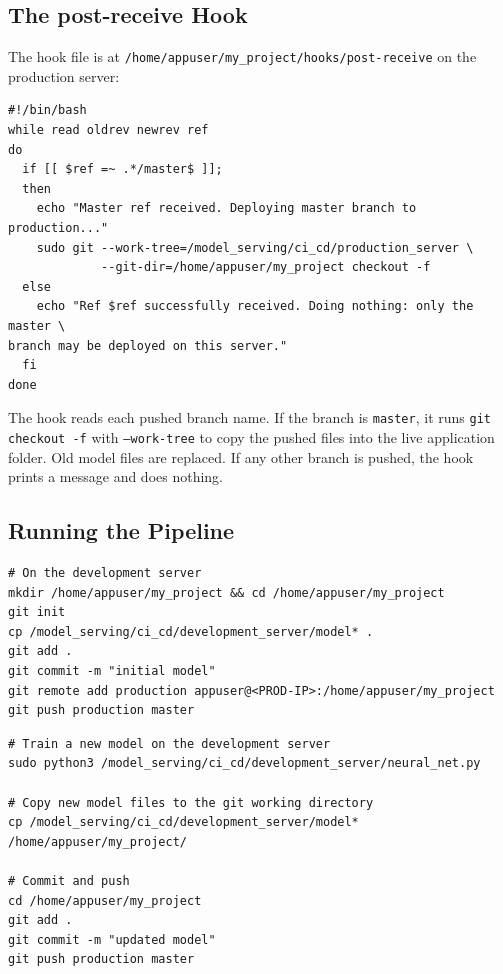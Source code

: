 \documentclass[11pt,a4paper]{article}
\begin{document}
\subsection{The post-receive Hook}

The hook file is at
\texttt{/home/appuser/my\_project/hooks/post-receive} on the production server:

\begin{lstlisting}[style=shell, caption={post-receive Git hook on the production server}]
#!/bin/bash
while read oldrev newrev ref
do
  if [[ $ref =~ .*/master$ ]];
  then
    echo "Master ref received. Deploying master branch to production..."
    sudo git --work-tree=/model_serving/ci_cd/production_server \
             --git-dir=/home/appuser/my_project checkout -f
  else
    echo "Ref $ref successfully received. Doing nothing: only the master \
branch may be deployed on this server."
  fi
done
\end{lstlisting}

The hook reads each pushed branch name. If the branch is \texttt{master}, it runs
\texttt{git checkout -f} with \texttt{--work-tree} to copy the pushed files into
the live application folder. Old model files are replaced. If any other branch is
pushed, the hook prints a message and does nothing.

\subsection{Running the Pipeline}

\begin{lstlisting}[style=shell, caption={Initial push from the development server}]
# On the development server
mkdir /home/appuser/my_project && cd /home/appuser/my_project
git init
cp /model_serving/ci_cd/development_server/model* .
git add .
git commit -m "initial model"
git remote add production appuser@<PROD-IP>:/home/appuser/my_project
git push production master
\end{lstlisting}

\begin{lstlisting}[style=shell, caption={Updating the model and pushing to production}]
# Train a new model on the development server
sudo python3 /model_serving/ci_cd/development_server/neural_net.py

# Copy new model files to the git working directory
cp /model_serving/ci_cd/development_server/model* /home/appuser/my_project/

# Commit and push
cd /home/appuser/my_project
git add .
git commit -m "updated model"
git push production master
\end{lstlisting}
\end{document}
